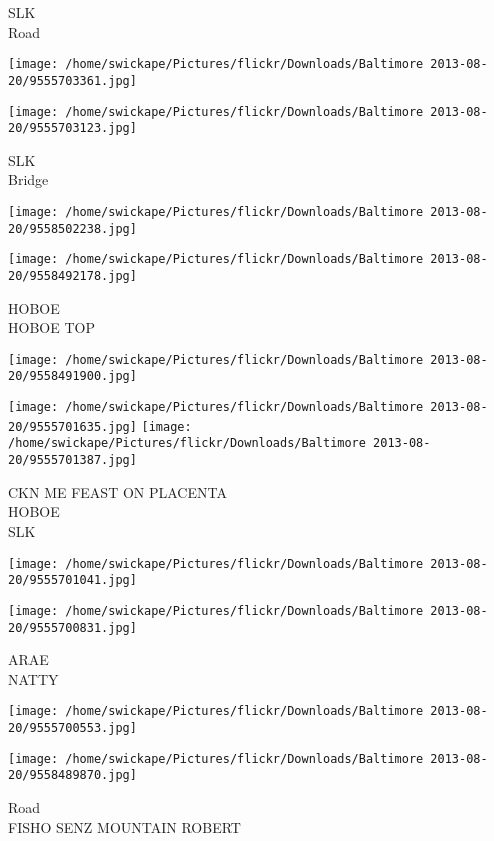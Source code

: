 \documentclass[10pt,letterpaper]{article}
\begin{document}
SLK\\
Road
\pagebreak

\texttt{[image: /home/swickape/Pictures/flickr/Downloads/Baltimore 2013-08-20/9555703361.jpg]}

\vspace{0.25in}
\texttt{[image: /home/swickape/Pictures/flickr/Downloads/Baltimore 2013-08-20/9555703123.jpg]}

SLK\\
Bridge
\pagebreak

\texttt{[image: /home/swickape/Pictures/flickr/Downloads/Baltimore 2013-08-20/9558502238.jpg]}

\vspace{0.25in}
\texttt{[image: /home/swickape/Pictures/flickr/Downloads/Baltimore 2013-08-20/9558492178.jpg]}

HOBOE\\
HOBOE TOP
\pagebreak

\texttt{[image: /home/swickape/Pictures/flickr/Downloads/Baltimore 2013-08-20/9558491900.jpg]}

\vspace{0.25in}
\texttt{[image: /home/swickape/Pictures/flickr/Downloads/Baltimore 2013-08-20/9555701635.jpg]}
\texttt{[image: /home/swickape/Pictures/flickr/Downloads/Baltimore 2013-08-20/9555701387.jpg]}

CKN ME FEAST ON PLACENTA\\
HOBOE\\
SLK
\pagebreak

\texttt{[image: /home/swickape/Pictures/flickr/Downloads/Baltimore 2013-08-20/9555701041.jpg]}

\vspace{0.25in}
\texttt{[image: /home/swickape/Pictures/flickr/Downloads/Baltimore 2013-08-20/9555700831.jpg]}

ARAE\\
NATTY
\pagebreak

\texttt{[image: /home/swickape/Pictures/flickr/Downloads/Baltimore 2013-08-20/9555700553.jpg]}

\vspace{0.25in}
\texttt{[image: /home/swickape/Pictures/flickr/Downloads/Baltimore 2013-08-20/9558489870.jpg]}

Road\\
FISHO SENZ MOUNTAIN ROBERT
\pagebreak
\end{document}
